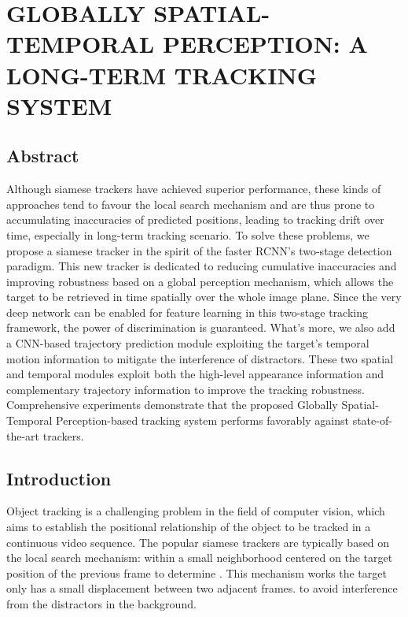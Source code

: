 \chapter{GLOBALLY SPATIAL-TEMPORAL PERCEPTION: A LONG-TERM TRACKING SYSTEM}\label{chap:globally}

\section{Abstract}
Although siamese trackers have achieved superior performance, these kinds of approaches tend to favour the local search mechanism and are thus prone to accumulating inaccuracies of predicted positions, leading to tracking drift over time, especially in long-term tracking scenario. To solve these problems, we propose a siamese tracker in the spirit of the faster RCNN's two-stage detection paradigm. This new tracker is dedicated to reducing cumulative inaccuracies and improving robustness based on a global perception mechanism, which allows the target to be retrieved in time spatially over the whole image plane. Since the very deep network can be enabled for feature learning in this two-stage tracking framework, the power of discrimination is guaranteed. What's more, we also add a CNN-based trajectory prediction module exploiting the target's temporal motion information to mitigate the interference of distractors.
These two spatial and temporal modules exploit both the high-level appearance information and complementary trajectory information to improve the tracking robustness. Comprehensive experiments demonstrate that the proposed Globally Spatial-Temporal Perception-based tracking system performs favorably against state-of-the-art trackers.

\section{Introduction}
\label{sec:intro}

Object tracking \cite{Leang2018OnlineFO, Wang2019VisualOT, Zhang2018UsingFL} is a challenging problem in the field of computer vision, which aims to establish the positional relationship of the object to be tracked in a continuous video sequence.
The popular siamese trackers \cite{SiamFC, SiamRPN, Wang2018SiamMask} are typically based on the local search mechanism:  within a small neighborhood centered on the target position of the previous frame to determine .
This mechanism works  the target only has a small displacement between two adjacent frames.
 to avoid interference from the distractors in the background.

